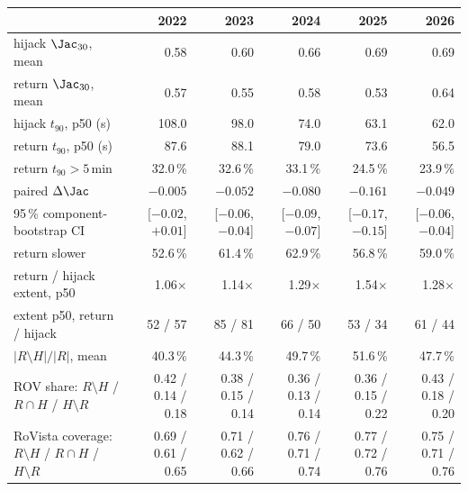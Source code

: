 \begin{tabular}{lrrrrr}
\toprule
 & 2022 & 2023 & 2024 & 2025 & 2026 \\
\midrule
hijack $\Jac_{30}$, mean & 0.58 & 0.60 & 0.66 & 0.69 & 0.69 \\
return $\Jac_{30}$, mean & 0.57 & 0.55 & 0.58 & 0.53 & 0.64 \\
hijack $t_{90}$, p50 (s) & 108.0 & 98.0 & 74.0 & 63.1 & 62.0 \\
return $t_{90}$, p50 (s) & 87.6 & 88.1 & 79.0 & 73.6 & 56.5 \\
return $t_{90}>5$\,min & 32.0\,\% & 32.6\,\% & 33.1\,\% & 24.5\,\% & 23.9\,\% \\
paired $\Delta\Jac$ & $-0.005$ & $-0.052$ & $-0.080$ & $-0.161$ & $-0.049$ \\
95\,\% component-bootstrap CI & [$-0.02$, $+0.01$] & [$-0.06$, $-0.04$] & [$-0.09$, $-0.07$] & [$-0.17$, $-0.15$] & [$-0.06$, $-0.04$] \\
return slower & 52.6\,\% & 61.4\,\% & 62.9\,\% & 56.8\,\% & 59.0\,\% \\
return / hijack extent, p50 & 1.06$\times$ & 1.14$\times$ & 1.29$\times$ & 1.54$\times$ & 1.28$\times$ \\
extent p50, return / hijack & 52 / 57 & 85 / 81 & 66 / 50 & 53 / 34 & 61 / 44 \\
$|R\setminus H|/|R|$, mean & 40.3\,\% & 44.3\,\% & 49.7\,\% & 51.6\,\% & 47.7\,\% \\
ROV share: $R\setminus H$ / $R\cap H$ / $H\setminus R$ & 0.42 / 0.14 / 0.18 & 0.38 / 0.15 / 0.14 & 0.36 / 0.13 / 0.14 & 0.36 / 0.15 / 0.22 & 0.43 / 0.18 / 0.20 \\
RoVista coverage: $R\setminus H$ / $R\cap H$ / $H\setminus R$ & 0.69 / 0.61 / 0.65 & 0.71 / 0.62 / 0.66 & 0.76 / 0.71 / 0.74 & 0.77 / 0.72 / 0.76 & 0.75 / 0.71 / 0.76 \\
\bottomrule
\end{tabular}
